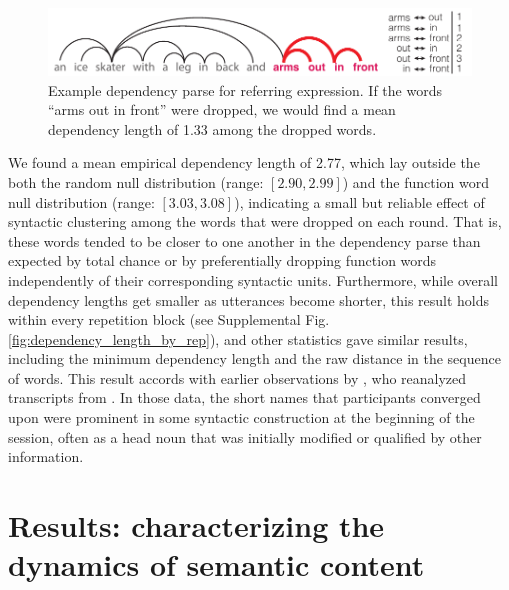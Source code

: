 \documentclass[alpha-refs]{wiley-article}
\begin{document}
\begin{figure}[t!]
\centering
\vspace{-1em}
\includegraphics[scale=.75]{dependency.pdf}
\caption{Example dependency parse for referring expression. If the words ``arms out in front'' were dropped, we would find a mean dependency length of 1.33 among the dropped words.}
\label{fig:dependency}
\end{figure}

We found a mean empirical dependency length of 2.77, which lay outside the both the random null distribution (range: $[2.90, 2.99]$) and the function word null distribution (range: $[3.03, 3.08]$), indicating a small but reliable effect of syntactic clustering among the words that were dropped on each round.
That is, these words tended to be closer to one another in the dependency parse than expected by total chance or by preferentially dropping function words independently of their corresponding syntactic units.
Furthermore, while overall dependency lengths get smaller as utterances become shorter, this result holds within every repetition block (see Supplemental Fig. \ref{fig:dependency_length_by_rep}), and other statistics gave similar results, including the minimum dependency length and the raw distance in the sequence of words.
This result accords with earlier observations by \cite{Carroll80_NamingHedges}, who reanalyzed transcripts from \cite{KraussWeinheimer64_ReferencePhrases}. In those data, the short names that participants converged upon were prominent in some syntactic construction at the beginning of the session, often as a head noun that was initially modified or qualified by other information.

\section{Results: characterizing the dynamics of semantic content}
\label{sec:content}
\end{document}
